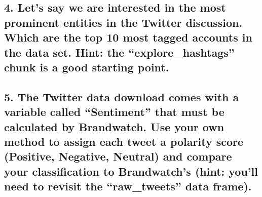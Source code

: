 \documentclass[
]{article}
\begin{document}
\hypertarget{lets-say-we-are-interested-in-the-most-prominent-entities-in-the-twitter-discussion.-which-are-the-top-10-most-tagged-accounts-in-the-data-set.-hint-the-explore_hashtags-chunk-is-a-good-starting-point.}{%
\subsection{4. Let's say we are interested in the most prominent
entities in the Twitter discussion. Which are the top 10 most tagged
accounts in the data set. Hint: the ``explore\_hashtags'' chunk is a
good starting
point.}\label{lets-say-we-are-interested-in-the-most-prominent-entities-in-the-twitter-discussion.-which-are-the-top-10-most-tagged-accounts-in-the-data-set.-hint-the-explore_hashtags-chunk-is-a-good-starting-point.}}

\hypertarget{the-twitter-data-download-comes-with-a-variable-called-sentiment-that-must-be-calculated-by-brandwatch.-use-your-own-method-to-assign-each-tweet-a-polarity-score-positive-negative-neutral-and-compare-your-classification-to-brandwatchs-hint-youll-need-to-revisit-the-raw_tweets-data-frame.}{%
\subsection{5. The Twitter data download comes with a variable called
``Sentiment'' that must be calculated by Brandwatch. Use your own method
to assign each tweet a polarity score (Positive, Negative, Neutral) and
compare your classification to Brandwatch's (hint: you'll need to
revisit the ``raw\_tweets'' data
frame).}\label{the-twitter-data-download-comes-with-a-variable-called-sentiment-that-must-be-calculated-by-brandwatch.-use-your-own-method-to-assign-each-tweet-a-polarity-score-positive-negative-neutral-and-compare-your-classification-to-brandwatchs-hint-youll-need-to-revisit-the-raw_tweets-data-frame.}}
\end{document}
